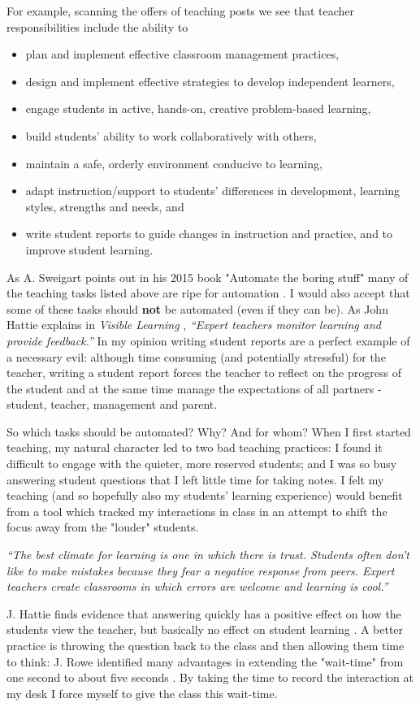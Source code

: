 \documentclass[10pt]{article}
\begin{document}
For example, scanning the offers of teaching posts we see that teacher responsibilities include the ability to
\begin{itemize}
\item plan and implement effective classroom management practices,
\item design and implement effective strategies to develop independent learners,
\item engage students in active, hands-on, creative problem-based learning,
\item build students’ ability to work collaboratively with others,
\item maintain a safe, orderly environment conducive to learning,
\item adapt instruction/support to students’ differences in development, learning styles, strengths and needs, and
\item write student reports to guide changes in instruction and practice, and to improve student learning.
\end{itemize}

As A. Sweigart points out in his 2015 book "Automate the boring stuff" many of the teaching tasks listed above are ripe for automation \cite{Swei15}. I would also accept that some of these tasks should \textbf{not} be automated (even if they can be). As John Hattie explains in \emph{Visible Learning} \cite{Hat12}, \emph{``Expert teachers monitor learning and provide feedback.''} In my opinion writing student reports are a perfect example of a necessary evil: although time consuming (and potentially stressful) for the teacher, writing a student report forces the teacher to reflect on the progress of the student and at the same time manage the expectations of all partners - student, teacher, management and parent.

So which tasks should be automated? Why? And for whom? When I first started teaching, my natural character led to two bad teaching practices: I found it difficult to engage with the quieter, more reserved students; and I was so busy answering student questions that I left little time for taking notes. I felt my teaching (and so hopefully also my students' learning experience) would benefit from a tool which tracked my interactions in class in an attempt to shift the focus away from the "louder" students. 
\begin{center} 
\emph{``The best climate for learning is one in which there is trust. Students often don’t like to make mistakes because they fear a negative response from peers. Expert teachers create classrooms in which errors are welcome and learning is cool.''} \cite{Hat12}
\end{center}
J. Hattie finds evidence that answering quickly has a positive effect on how the students view the teacher, but basically no effect on student learning \cite[p.184]{Hat12}. A better practice is throwing the question back to the class and then allowing them time to think: J. Rowe identified many advantages in extending the "wait-time" from one second to about five seconds \cite{Rowe72}. By taking the time to record the interaction at my desk I force myself to give the class this wait-time.
\end{document}
